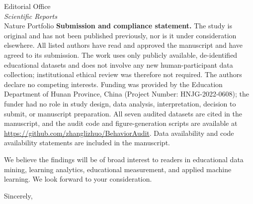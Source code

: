\documentclass[11pt]{letter}
\begin{document}
\begin{letter}{Editorial Office \\ \textit{Scientific Reports} \\ Nature Portfolio}
\textbf{Submission and compliance statement.}
The study is original and has not been published previously, nor is it under consideration elsewhere. All listed authors have read and approved the manuscript and have agreed to its submission. The work uses only publicly available, de-identified educational datasets and does not involve any new human-participant data collection; institutional ethical review was therefore not required. The authors declare no competing interests. Funding was provided by the Education Department of Hunan Province, China (Project Number: HNJG-2022-0608); the funder had no role in study design, data analysis, interpretation, decision to submit, or manuscript preparation. All seven audited datasets are cited in the manuscript, and the audit code and figure-generation scripts are available at \url{https://github.com/zhanglizhuo/BehaviorAudit}. Data availability and code availability statements are included in the manuscript.

We believe the findings will be of broad interest to readers in educational data mining, learning analytics, educational measurement, and applied machine learning. We look forward to your consideration.

\closing{Sincerely,}

\end{letter}
\end{document}
